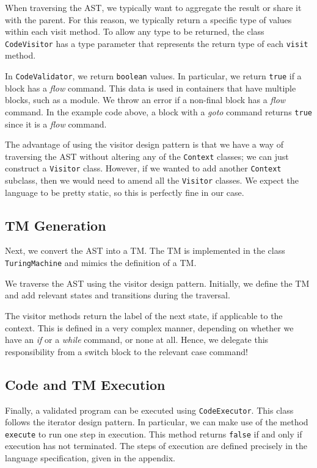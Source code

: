 When traversing the AST, we typically want to aggregate the result or share it with the parent. For this reason, we typically return a specific type of values within each visit method. To allow any type to be returned, the class \texttt{CodeVisitor} has a type parameter that represents the return type of each \texttt{visit} method.

In \texttt{CodeValidator}, we return \texttt{boolean} values. In particular, we return \texttt{true} if a block has a \textit{flow} command. This data is used in containers that have multiple blocks, such as a module. We throw an error if a non-final block has a \textit{flow} command. In the example code above, a block with a \textit{goto} command returns \texttt{true} since it is a \textit{flow} command. 


The advantage of using the visitor design pattern is that we have a way of traversing the AST without altering any of the \texttt{Context} classes; we can just construct a \texttt{Visitor} class. However, if we wanted to add another \texttt{Context} subclass, then we would need to amend all the \texttt{Visitor} classes. We expect the language to be pretty static, so this is perfectly fine in our case.


\subsection{TM Generation}
Next, we convert the AST into a TM. The TM is implemented in the class \texttt{TuringMachine} and mimics the definition of a TM.

We traverse the AST using the visitor design pattern. Initially, we define the TM and add relevant states and transitions during the traversal. 

The visitor methods return the label of the next state, if applicable to the context. This is defined in a very complex manner, depending on whether we have an \textit{if} or a \textit{while} command, or none at all. Hence, we delegate this responsibility from a switch block to the relevant case command!

\subsection{Code and TM Execution}
Finally, a validated program can be executed using \texttt{CodeExecutor}. This class follows the iterator design pattern. In particular, we can make use of the method \texttt{execute} to run one step in execution. This method returns \texttt{false} if and only if execution has not terminated. The steps of execution are defined precisely in the language specification, given in the appendix.

